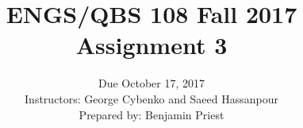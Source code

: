 \documentclass[12pt]{article}
\begin{document}
 


\title{ENGS/QBS 108 Fall 2017 Assignment 3}
\author{Due October 17, 2017 \\ Instructors: George Cybenko and Saeed Hassanpour \\ Prepared by: Benjamin Priest}
\date{}
\maketitle

\pagebreak

\end{document}

